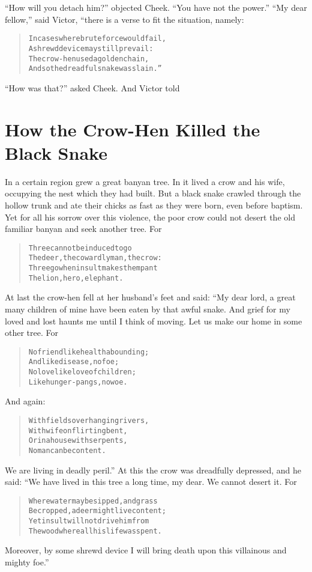 \documentclass[article, twoside, 14pt]{memoir}
\renewenvironment{verbatim}{%
\begin{quote}%
\vskip -10pt%
\begin{alltt}\normalfont\large}{\end{alltt}%
\end{quote}%
\vskip -10pt
} %
\begin{document}
``How will you detach him?'' objected Cheek.
``You have not the power.'' ``My dear fellow,'' said Victor, “there
is a verse to fit the situation, namely:

\begin{verbatim}
In cases where brute force would fail,
    A shrewd device may still prevail:
The crow-hen used a golden chain,
    And so the dreadful snake was slain.”
\end{verbatim}
``How was that?'' asked Cheek. And Victor told

\chapter{How the Crow-Hen Killed the Black Snake}

\label{s8}

In a certain region grew a great banyan tree. In it lived a
crow and his wife, occupying the nest which they had built. But a
black snake crawled through the hollow trunk and ate their chicks
as fast as they were born, even before baptism. Yet for all his
sorrow over this violence, the poor crow could not desert the old
familiar banyan and seek another tree. For

\begin{verbatim}
Three cannot be induced to go{\textemdash}
The deer, the cowardly man, the crow:
Three go when insult makes them pant{\textemdash}
The lion, hero, elephant.
\end{verbatim}
At last the crow-hen fell at her husband's feet and said: “My dear
lord, a great many children of mine have been eaten by that awful
snake. And grief for my loved and lost haunts me until I think of
moving. Let us make our home in some other tree. For

\begin{verbatim}
No friend like health abounding;
    And like disease, no foe;
No love like love of children;
    Like hunger-pangs, no woe.
\end{verbatim}
And again:

\begin{verbatim}
With fields overhanging rivers,
    With wife on flirting bent,
Or in a house with serpents,
    No man can be content.
\end{verbatim}
We are living in deadly peril.” At this the crow was dreadfully
depressed, and he said: “We have lived in this tree a long time, my
dear. We cannot desert it. For

\begin{verbatim}
Where water may be sipped, and grass
    Be cropped, a deer might live content;
Yet insult will not drive him from
    The wood where all his life was spent.
\end{verbatim}
Moreover, by some shrewd device I will bring death upon this
villainous and mighty foe.”
\end{document}
